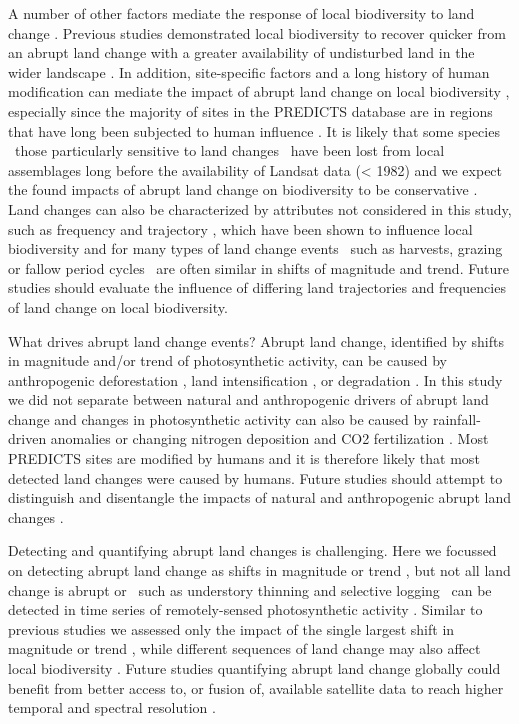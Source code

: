 A number of other factors mediate the response of local biodiversity to land change \citep{Arroyo-Rodriguez2015}.  Previous studies demonstrated local biodiversity to recover quicker from an abrupt land change with a greater availability of undisturbed land in the wider landscape \citep{Turner1989,Chase2003,Shackelford2017}. In addition, site-specific factors and a long history of human modification can mediate the impact of abrupt land change on local biodiversity \citep{Ellis2015a,Jung2016}, especially since the majority of sites in the PREDICTS database are in regions that have long been subjected to human influence \citep{Newbold2016a,Hudson2016}. It is likely that some species \textendash\ those particularly sensitive to land changes \textendash\ have been lost from local assemblages long before the availability of Landsat data (< 1982) and we expect the found impacts of abrupt land change on biodiversity to be conservative \citep{Mihoub2017}. Land changes can also be characterized by attributes not considered in this study, such as frequency and trajectory \citep{Watson2014}, which have been shown to influence local biodiversity \citep{Tiemann2015,Wood2017} and for many types of land change events \textendash\ such as harvests, grazing or fallow period cycles \citep{Kleyer2007,Ray2013} \textendash\ are often similar in shifts of magnitude and trend. Future studies should evaluate the influence of differing land trajectories and frequencies of land change on local biodiversity.

What drives abrupt land change events? Abrupt land change, identified by shifts in magnitude and/or trend of photosynthetic activity, can be caused by anthropogenic deforestation \citep{DeVries2015b}, land intensification \citep{Fensholt2012,Muller2014}, or degradation \citep{Tian2015,Aguiar2017}. In this study we did not separate between natural and anthropogenic drivers of abrupt land change and changes in photosynthetic activity can also be caused by rainfall-driven anomalies \citep{Papagiannopoulou2017} or changing nitrogen deposition and CO2 fertilization \citep{Zhu2016}. Most PREDICTS sites are modified by humans \citep{Newbold2016a,Hudson2016} and it is therefore likely that most detected land changes were caused by humans. Future studies should attempt to distinguish and disentangle the impacts of natural and anthropogenic abrupt land changes \citep{Curtis2018}. 

Detecting and quantifying abrupt land changes is challenging. Here we focussed on detecting abrupt land change as shifts in magnitude or trend \citep{Verbesselt2010a}, but not all land change is abrupt \citep{Vogelmann2012a} or \textendash\ such as understory thinning and selective logging \textendash\ can be detected in time series of remotely-sensed photosynthetic activity \citep{Asner2005,Peres2006}. Similar to previous studies we assessed only the impact of the single largest shift in magnitude or trend \citep{dejong2013,Song2018}, while different sequences of land change may also affect local biodiversity \citep{Watson2014}. Future studies quantifying abrupt land change globally could benefit from better access to, or fusion of, available satellite data to reach higher temporal and spectral resolution \citep{Reiche2015,Wulder2015}.

